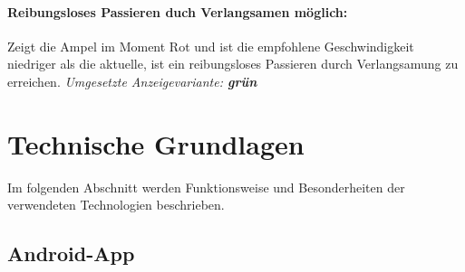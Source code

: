 \paragraph{Reibungsloses Passieren duch Verlangsamen möglich:} Zeigt die Ampel im Moment Rot und ist die empfohlene Geschwindigkeit niedriger als die aktuelle, ist ein reibungsloses Passieren durch Verlangsamung zu erreichen.
\textit{Umgesetzte Anzeigevariante: \textbf{grün}}
\section{Technische Grundlagen}
Im folgenden Abschnitt werden Funktionsweise und Besonderheiten der verwendeten Technologien beschrieben.
\subsection{Android-App}

